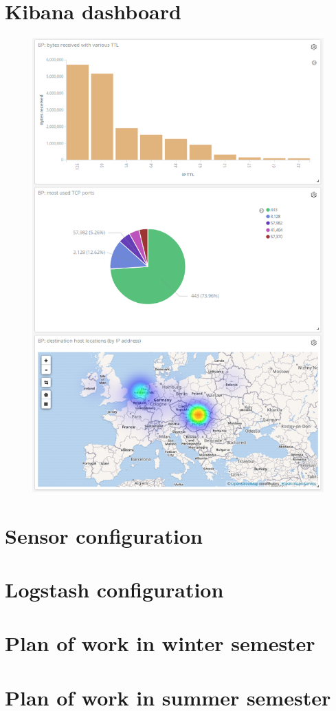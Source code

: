 \documentclass[12pt,a4paper,twoside]{report}
\begin{document}
\begin{appendices}
	\chapter{Kibana dashboard} \label{appendix:sol:dashboard}
		\begin{figure}[h]
			\centering
			\includegraphics[scale=0.38]{dashboard}
		\end{figure}
	\chapter{Sensor configuration} \label{appendix:implementation:config}
		
	\chapter{Logstash configuration} \label{appendix:implementation:logstash}
		
	\chapter{Plan of work in winter semester}
			
	\chapter{Plan of work in summer semester}
		
\end{appendices}
\end{document}
